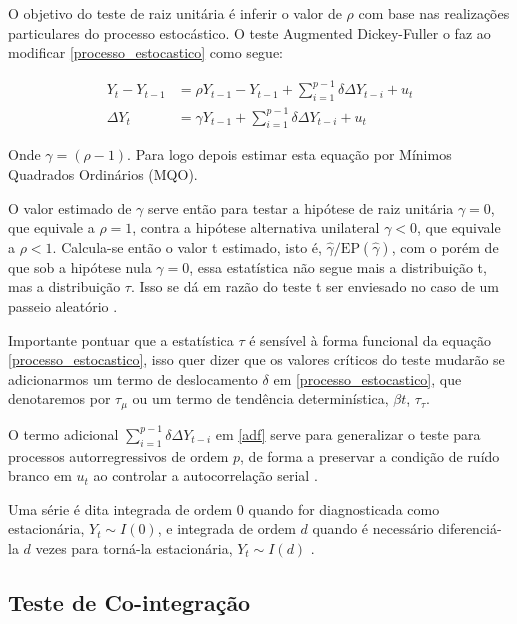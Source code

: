 \documentclass[a4paper,
               article,
               12pt,
               openany,
               oneside,
               english,
               brazil]{abntex2}
\numberwithin{equation}{section}
\begin{document}
    O objetivo do teste de raiz unitária é inferir o valor de $ \rho $ com base nas realizações particulares do processo estocástico. O teste Augmented Dickey-Fuller o faz ao modificar \eqref{processo_estocastico} como segue:

    \begin{align}
        \label{adf}
        Y_t - Y_{t-1} &= \rho Y_{t-1} - Y_{t-1} + \sum_{i = 1}^{p-1}\delta \Delta Y_{t-i} + u_t \nonumber \\
        \Delta Y_t &= \gamma Y_{t-1} + \sum_{i = 1}^{p-1}\delta \Delta Y_{t-i} + u_t
    \end{align}

    Onde $ \gamma = (\rho - 1) $. Para logo depois estimar esta equação por Mínimos Quadrados Ordinários (MQO).
   
    O valor estimado de $ \gamma $ serve então para testar a hipótese de raiz unitária $ \gamma = 0 $, que equivale a $ \rho = 1 $, contra a hipótese alternativa unilateral $ \gamma < 0 $, que equivale a $ \rho < 1 $. Calcula-se então o valor t estimado, isto é, $ \hat{\gamma} / \text{EP}(\hat{\gamma}) $, com o porém de que sob a hipótese nula $ \gamma = 0 $, essa estatística não segue mais a distribuição t, mas a distribuição $ \tau $. Isso se dá em razão do teste t ser enviesado no caso de um passeio aleatório \cite[p.~748-749]{gujarati}.

    Importante pontuar que a estatística $ \tau $ é sensível à forma funcional da equação \eqref{processo_estocastico}, isso quer dizer que os valores críticos do teste mudarão se adicionarmos um termo de deslocamento $ \delta $ em \eqref{processo_estocastico}, que denotaremos por $ \tau_{\mu} $ ou um termo de tendência determinística, $ \beta t $, $ \tau_{\tau} $.
   
    O termo adicional $ \sum_{i = 1}^{p-1}\delta \Delta Y_{t-i} $ em \eqref{adf} serve para generalizar o teste para processos autorregressivos de ordem $ p $, de forma a preservar a condição de ruído branco em $ u_t $ ao controlar a autocorrelação serial \cite[p.~40]{gustavo}.

    Uma série é dita integrada de ordem 0 quando for diagnosticada como estacionária, $ Y_t \sim I(0) $, e integrada de ordem $ d $ quando é necessário diferenciá-la $ d $ vezes para torná-la estacionária, $ Y_t \sim I(d) $ \cite[p.~740]{gujarati}.

    \subsection{Teste de Co-integração}
\end{document}
